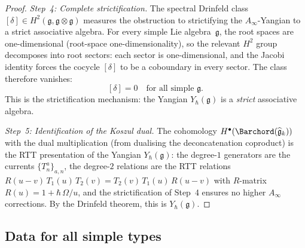 \begin{proof}
\emph{Step~4: Complete strictification.}
The spectral Drinfeld class $[\delta]\in H^2(\mathfrak{g},
\mathfrak{g}\otimes\mathfrak{g})$ measures the obstruction
to strictifying the $A_\infty$-Yangian to a strict associative
algebra. For every simple Lie algebra~$\mathfrak{g}$, the
root spaces are one-dimensional
(root-space one-dimensionality),
so the relevant $H^2$ group decomposes into root sectors:
each sector is one-dimensional, and the Jacobi identity forces
the cocycle $[\delta]$ to be a coboundary in every sector.
The class therefore vanishes:
\begin{equation}\label{eq:strictification}
[\delta] = 0
\quad\text{for all simple }\mathfrak{g}.
\end{equation}
This is the strictification mechanism: the Yangian
$Y_\hbar(\mathfrak{g})$ is a \emph{strict} associative
algebra.

\emph{Step~5: Identification of the Koszul dual.}
The cohomology $H^\bullet(\Barchord
(\widehat{\mathfrak{g}}_k))$ with the dual multiplication
(from dualising the deconcatenation coproduct) is the
RTT presentation of the Yangian $Y_\hbar(\mathfrak{g})$:
the degree-$1$ generators are the currents
$\{T^a_n\}_{a,n}$, the degree-$2$ relations are the RTT
relations $R(u-v)\,T_1(u)\,T_2(v) = T_2(v)\,T_1(u)\,R(u-v)$
with $R$-matrix $R(u) = 1 + \hbar\,\Omega/u$, and the
strictification of Step~4 ensures no higher $A_\infty$
corrections. By the Drinfeld theorem, this is
$Y_\hbar(\mathfrak{g})$.
\end{proof}

\subsection{Data for all simple types}

